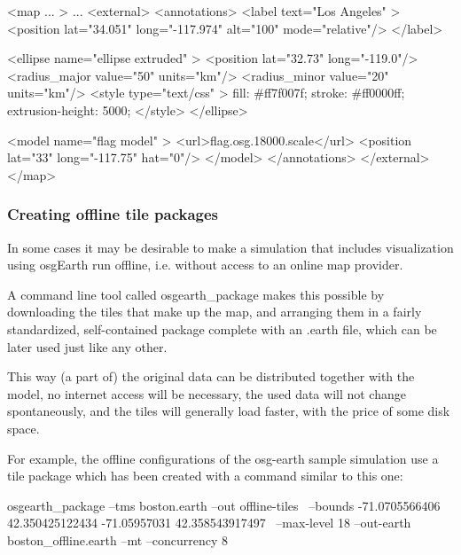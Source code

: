 \begin{filelisting}
<map ... >
    ...
    <external>
        <annotations>
            <label text="Los Angeles" >
                <position lat="34.051" long="-117.974" alt="100" mode="relative"/>
            </label>

            <ellipse name="ellipse extruded" >
                <position lat="32.73" long="-119.0"/>
                <radius_major value="50" units="km"/>
                <radius_minor value="20" units="km"/>
                <style type="text/css" >
                    fill:             #ff7f007f;
                    stroke:           #ff0000ff;
                    extrusion-height: 5000;
                </style>
            </ellipse>

            <model name="flag model" >
                <url>flag.osg.18000.scale</url>
                <position lat="33" long="-117.75" hat="0"/>
            </model>
        </annotations>
    </external>
</map>
\end{filelisting}

\subsubsection{Creating offline tile packages}
\label{sec:graphics:offline-tiles}

In some cases it may be desirable to make a simulation that includes visualization
using osgEarth run offline, i.e. without access to an online map provider.

A command line tool called osgearth\_package makes this possible by downloading
the tiles that make up the map, and arranging them in a fairly standardized,
self-contained package complete with an .earth file, which can be later used just
like any other.

This way (a part of) the original data can be distributed together with the model,
no internet access will be necessary, the used data will not change spontaneously,
and the tiles will generally load faster, with the price of some disk space.

For example, the offline configurations of the osg-earth sample simulation use
a tile package which has been created with a command similar to this one:

\begin{commandline}
osgearth_package --tms boston.earth --out offline-tiles \
  --bounds -71.0705566406 42.350425122434 -71.05957031 42.358543917497 \
  --max-level 18 --out-earth boston_offline.earth --mt --concurrency 8
\end{commandline}

